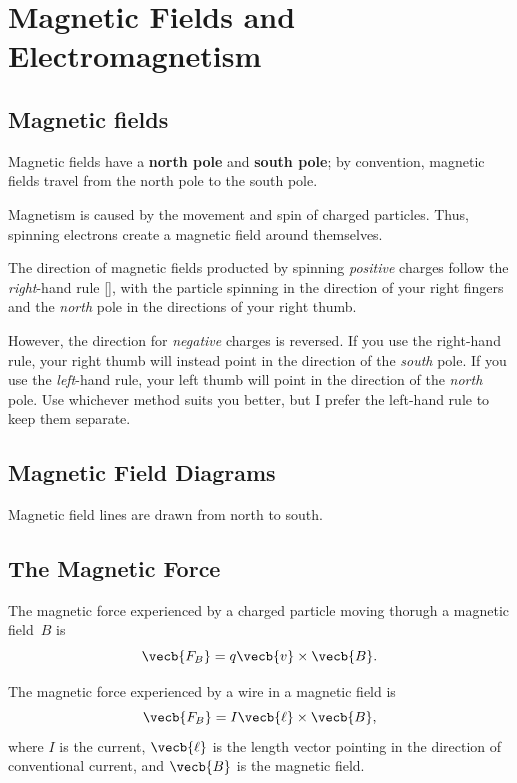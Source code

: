 \chapter{Magnetic Fields and Electromagnetism}

\section{Magnetic fields}

Magnetic fields have a \textbf{north pole} and \textbf{south pole};
by convention, magnetic fields travel from the north pole to the south pole.

Magnetism is caused by the movement and spin of charged particles.
Thus, spinning electrons create a magnetic field around themselves.

The direction of magnetic fields producted by spinning \emph{positive} charges
follow the \emph{right}-hand rule [],
with the particle spinning in the direction of your right fingers
and the \emph{north} pole in the directions of your right thumb.

However, the direction for \emph{negative} charges is reversed.
If you use the right-hand rule,
your right thumb will instead point in the direction of the \emph{south} pole.
If you use the \emph{left}-hand rule,
your left thumb will point in the direction of the \emph{north} pole.
Use whichever method suits you better,
but I prefer the left-hand rule to keep them separate.

\section{Magnetic Field Diagrams}

Magnetic field lines are drawn from north to south.

\section{The Magnetic Force}

The magnetic force experienced by a charged particle
moving thorugh a magnetic field~\(B\) is
\begin{equation}
    \vecb{F_B} = q \vecb{v} \times \vecb{B}.
\end{equation}

The magnetic force experienced by a wire in a magnetic field is
\begin{equation}
    \vecb{F_B} = I \vecb{\ell} \times \vecb{B},
\end{equation}
where \(I\) is the current,
\(\vecb{\ell}\) is the length vector
pointing in the direction of conventional current,
and \(\vecb{B}\) is the magnetic field.

